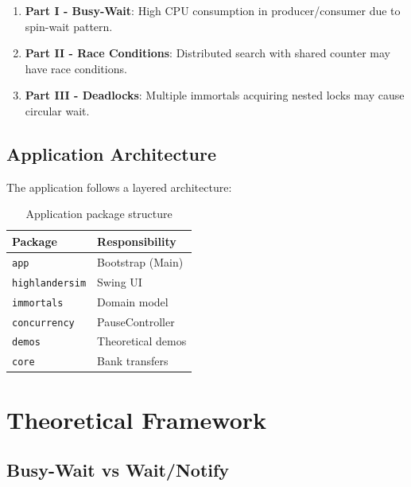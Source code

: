 \documentclass[10pt,a4paper,twocolumn]{article}
\begin{document}
\begin{warningbox}
\begin{enumerate}
    \item \textbf{Part I - Busy-Wait}: High CPU consumption in producer/consumer due to spin-wait pattern.
    \item \textbf{Part II - Race Conditions}: Distributed search with shared counter may have race conditions.
    \item \textbf{Part III - Deadlocks}: Multiple immortals acquiring nested locks may cause circular wait.
\end{enumerate}
\end{warningbox}

\subsection{Application Architecture}

The application follows a layered architecture:

\begin{table}[H]
    \centering
    \small
    \begin{tabular}{|l|l|}
        \hline
        \textbf{Package} & \textbf{Responsibility} \\
        \hline
        \texttt{app} & Bootstrap (Main) \\
        \hline
        \texttt{highlandersim} & Swing UI \\
        \hline
        \texttt{immortals} & Domain model \\
        \hline
        \texttt{concurrency} & PauseController \\
        \hline
        \texttt{demos} & Theoretical demos \\
        \hline
        \texttt{core} & Bank transfers \\
        \hline
    \end{tabular}
    \caption{Application package structure}
    \label{tab:packages}
\end{table}

\section{Theoretical Framework}

\subsection{Busy-Wait vs Wait/Notify}
\end{document}
